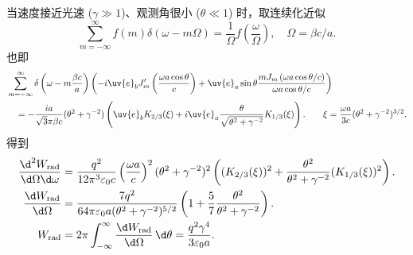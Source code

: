 \begin{example}
	当速度接近光速 (\(\gamma \gg 1\))、观测角很小 (\(\theta \ll 1\)) 时，取连续化近似
	\begin{equation*}
		\sum_{m=-\infty}^{\infty} f(m) \delta(\omega - m \Omega) = \frac{1}{\Omega} f(\frac{\omega}{\Omega}), \quad \Omega = \beta c/a.
	\end{equation*}
	也即
	\begin{align*}
		&\sum_{m=-\infty}^{\infty} \delta\left( \omega - m \frac{\beta c}{a} \right) \left( -i \uv{e}_{b} J_{m}'\left( \frac{\omega a \cos\theta}{c} \right) + \uv{e}_{a} \sin\theta \frac{m J_{m}\left(\omega a \cos\theta/c \right)}{\omega a \cos\theta/c} \right) \\&\quad= -\frac{i a}{\sqrt{3}\pi \beta c} (\theta^{2} + \gamma^{-2}) \left( \uv{e}_{b} K_{2/3}(\xi) + i \uv{e}_{a} \frac{\theta}{\sqrt{\theta^{2} + \gamma^{-2}}} K_{1/3}(\xi) \right). \qquad
		\xi = \frac{\omega a}{3c} (\theta^{2} + \gamma^{-2})^{3/2}.
	\end{align*}
	得到
	\begin{align*}
		\frac{\d^{2} W_{\mathrm{rad}}}{\d \Omega \d \omega} &= \frac{q^{2}}{12\pi^{3} \varepsilon_{0} c} \left( \frac{\omega a}{c} \right)^{2} (\theta^{2} + \gamma^{-2})^{2} \left( (K_{2/3}(\xi))^{2} + \frac{\theta^{2}}{\theta^{2} + \gamma^{-2}} (K_{1/3}(\xi))^{2} \right). \\
		\frac{\d  W_{\mathrm{rad}}}{\d \Omega} &= \frac{7 q^{2}}{64\pi \varepsilon_{0} a (\theta^{2} + \gamma^{-2})^{5/2}} \left( 1 + \frac{5}{7} \frac{\theta^{2}}{\theta^{2} + \gamma^{-2}} \right). \\
		W_{\mathrm{rad}} &= 2\pi \int_{-\infty}^{\infty} \frac{\d  W_{\mathrm{rad}}}{\d \Omega} \, \d \theta = \frac{q^{2} \gamma^{4}}{3 \varepsilon_{0} a}.
	\end{align*}
\end{example}

